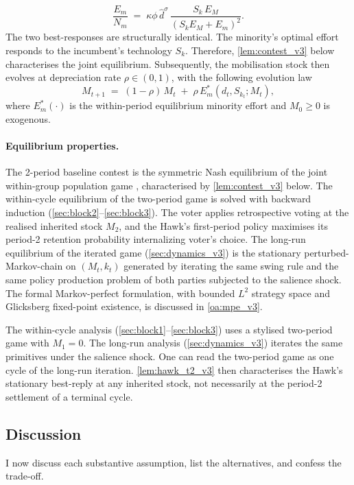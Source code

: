 \documentclass[11pt,twoside]{extarticle}
\begin{document}
\begin{equation}\label{eq:Em_BR_v3}
    \frac{E_m}{N_m}\;=\;\kappa\phi\,\hat d^\sigma\,\frac{S_k\,E_M}{(S_k E_M+E_m)^2}.
\end{equation}
The two best-responses are structurally identical. The minority's optimal effort responds to the incumbent's technology $S_k$. Therefore, \autoref{lem:contest_v3} below characterises the joint equilibrium. Subsequently, the mobilisation stock then evolves at depreciation rate $\rho\in(0,1)$, with the following evolution law
\begin{equation}\label{eq:M_evolution_v3}
    M_{t+1}\;=\;(1-\rho)\,M_t\;+\;\rho\,E_m^*(d_t,S_{k_t};M_t),
\end{equation}
where $E_m^*(\cdot)$ is the within-period equilibrium minority effort and $M_0\ge 0$ is exogenous. 

\paragraph{Equilibrium properties.} The 2-period baseline contest is the symmetric Nash equilibrium of the joint within-group population game \citep*{sandholmPopulationGamesEvolutionary2010}, characterised by \autoref{lem:contest_v3} below.
The within-cycle equilibrium of the two-period game is solved with backward induction (\autoref{sec:block2}--\autoref{sec:block3}). 
The voter applies retrospective voting at the realised inherited stock $M_2$, and the Hawk's first-period policy maximises its period-2 retention probability internalizing voter's choice. 
The long-run equilibrium of the iterated game (\autoref{sec:dynamics_v3}) is the stationary perturbed-Markov-chain on $(M_t,k_t)$ generated by iterating the same swing rule and the same policy production problem of both parties subjected to the salience shock. The formal Markov-perfect formulation, with bounded $L^2$ strategy space and Glicksberg fixed-point existence, is discussed in \autoref{oa:mpe_v3}.

The within-cycle analysis (\autoref{sec:block1}--\autoref{sec:block3}) uses a stylised two-period game with $M_1=0$. The long-run analysis (\autoref{sec:dynamics_v3}) iterates the same primitives under the salience shock. One can read the two-period game as one cycle of the long-run iteration. \autoref{lem:hawk_t2_v3} then characterises the Hawk's stationary best-reply at any inherited stock, not necessarily at the period-2 settlement of a terminal cycle.

\subsection{ Discussion}\label{subsec:discussion_v3} 
I now discuss each substantive assumption, list the alternatives, and confess the trade-off.
\end{document}
